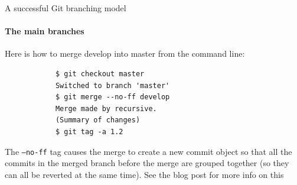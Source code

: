 \documentclass[10pt, aspectratio=169, xcolor=dvipsnames]{beamer}
\begin{document}
\begin{frame}[fragile, t]{A successful Git branching model}
    \framesubtitle{The main branches}

    \normalsize\vspace{0.5em} Here is how to merge \alert{develop} into \alert{master} from the command line:
    
    \vspace{-0.5em}
    \begin{verbatim}
            $ git checkout master
            Switched to branch 'master'
            $ git merge --no-ff develop
            Merge made by recursive.
            (Summary of changes)
            $ git tag -a 1.2    
    \end{verbatim}

    \footnotesize\vspace{-0.5em} The \texttt{--no-ff} tag causes the merge to create a new commit object so that all the commits in the merged branch before the merge are grouped together (so they can all be reverted at the same time). See the blog post for more info on this
\end{frame}
\end{document}
